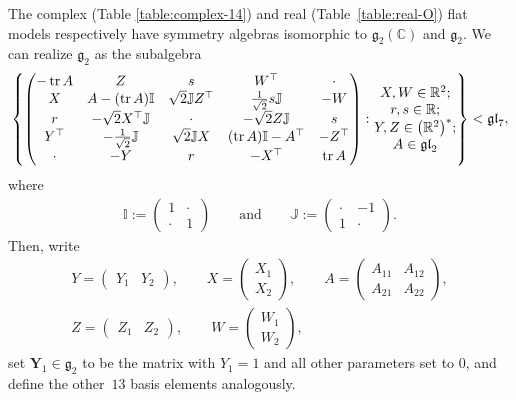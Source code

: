 \documentclass[10pt,a4paper]{amsart}
\DeclareMathOperator{\tr} {tr}
\newcommand{\bbC}{\mathbb{C}}
\newcommand{\bbI}{\mathbb{I}}
\newcommand{\bbJ}{\mathbb{J}}
\newcommand{\bbR}{\mathbb{R}}
\newcommand{\mbY}{\mathbf{Y}}
\newcommand{\mfg} {\mathfrak{g}}
\newcommand{\mfgl} {\mathfrak{gl}}
\numberwithin{equation}{section}
\begin{document}
The complex (Table \ref{table:complex-14}) and real (Table~\ref{table:real-O}) flat models respectively have symmetry algebras isomorphic to $\mfg_2(\bbC)$ and $\mfg_2$. We can realize $\mfg_2$ as the subalgebra \cite{SagerschnigWillseOperator}
\begin{gather}\label{equation:g2}
	\left\{
		\begin{pmatrix}
			- \tr A & Z & s & W^{\top} & \cdot \\
			X & A - (\tr A) \bbI & \sqrt{2} \bbJ Z^{\top} & \frac{1}{\sqrt{2}} s \bbJ & -W \\
			r & -\sqrt{2} X^{\top} \bbJ & \cdot & -\sqrt{2} Z \bbJ & s \\
			Y^{\top} & -\frac{1}{\sqrt{2}} \bbJ & \sqrt{2} \bbJ X & (\tr A) \bbI - A^{\top} & -Z^{\top} \\
			\cdot & -Y & r & -X^{\top} & \tr A
		\end{pmatrix}
			\colon
		\begin{array}{@{}c@{}}
			X, W \in \bbR^2 ; \\
			r, s \in \bbR ; \\
			Y, Z \in \big(\bbR^2\big)^*; \\
			A \in \mfgl_2
		\end{array}
	\right\} < \mfgl_7 ,
\end{gather}
where
\begin{gather*}
	\bbI := \begin{pmatrix}1&\cdot\\ \cdot&1\end{pmatrix}
		\qquad \textrm{and} \qquad
	\bbJ := \begin{pmatrix}\cdot&-1\\1&\cdot\end{pmatrix} .
\end{gather*}
Then, write
\begin{gather*}
	Y = \begin{pmatrix}Y_1 & Y_2\end{pmatrix}, \qquad
	X = \begin{pmatrix}X_1 \\ X_2\end{pmatrix}, \qquad
	A = \begin{pmatrix}A_{11} & A_{12} \\ A_{21} & A_{22}\end{pmatrix}, \\
	Z = \begin{pmatrix}Z_1 & Z_2\end{pmatrix}, \qquad
	W = \begin{pmatrix}W_1 \\ W_2\end{pmatrix},
\end{gather*}
set $\mbY_1 \in \mfg_2$ to be the matrix with $Y_1 = 1$ and all other parameters set to $0$, and define the other~$13$ basis elements analogously.
\end{document}
